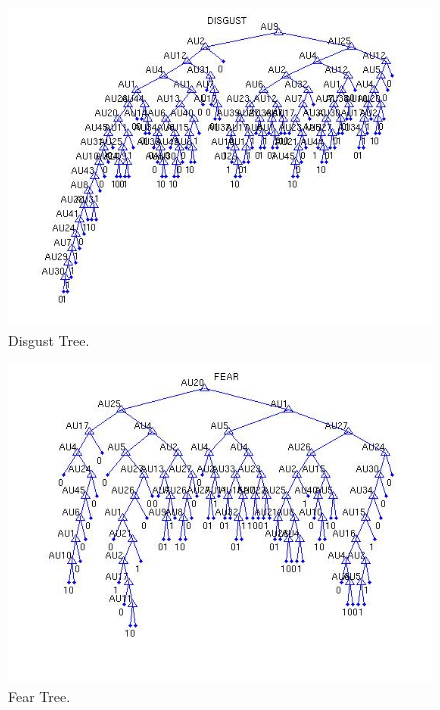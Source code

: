 \documentclass[a4paper,12pt,oneside,final]{report}
\begin{document}
\begin{figure}[!h]
\center
\includegraphics[scale=0.6]{disgust.jpg}
\caption{Disgust Tree.}
\end{figure}

\begin{figure}[!h]
\center
\includegraphics[scale=0.6]{fear.jpg}
\caption{Fear Tree.}
\end{figure}
\end{document}
